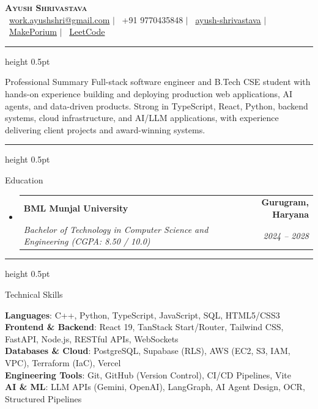 \documentclass[letterpaper,10pt]{article}
\makeatletter
\renewcommand{\section}{\@ifstar\@sectionStar\@sectionNoStar}
\newcommand{\@sectionStar}[1]{%
  \par\vspace{4.5pt}%
  {\large\bfseries\scshape #1}%
  \par\vspace{2.5pt}%
  \hrule height 0.5pt%
  \par\vspace{3.5pt}%
}
\newcommand{\@sectionNoStar}[1]{%
  \par\vspace{4.5pt}%
  {\large\bfseries\scshape #1}%
  \par\vspace{2.5pt}%
  \hrule height 0.5pt%
  \par\vspace{3.5pt}%
}
\newcommand{\resumeSubheading}[4]{
  \item
    \begin{tabular*}{\textwidth}[t]{l@{\extracolsep{\fill}}r}
      \textbf{#1} & \textbf{\small #2} \\
      \textit{\small#3} & \textit{\small #4} \\
    \end{tabular*}\vspace{-2pt}
}
\newcommand{\resumeSubHeadingListStart}{\begin{itemize}[leftmargin=0.0in, label={}, topsep=1pt, itemsep=2.5pt]}
\newcommand{\resumeSubHeadingListEnd}{\end{itemize}\vspace{-2pt}}
\makeatother
\begin{document}
\begin{center}
    {\LARGE \scshape \textbf{Ayush Shrivastava}} \\ \vspace{3pt}
    \small 
    \faEnvelope\ \href{mailto:work.ayushshri@gmail.com}{work.ayushshri@gmail.com} \quad$|$\quad
    \faPhone\ +91 9770435848 \quad$|$\quad
    \faLinkedin\ \href{https://www.linkedin.com/in/ayush-shrivastava-9439a232b/}{ayush-shrivastava} \quad$|$\quad
    \faGithub\ \href{https://github.com/MakePorium}{MakePorium} \quad$|$\quad
    \faCode\ \href{https://leetcode.com/u/MakePorium/}{LeetCode}
\end{center}
\vspace{-4pt}

\section{Professional Summary}
\small{Full-stack software engineer and B.Tech CSE student with hands-on experience building and deploying production web applications, AI agents, and data-driven products. Strong in TypeScript, React, Python, backend systems, cloud infrastructure, and AI/LLM applications, with experience delivering client projects and award-winning systems.}

\section{Education}
  \resumeSubHeadingListStart
    \resumeSubheading
      {BML Munjal University}{Gurugram, Haryana}
      {Bachelor of Technology in Computer Science and Engineering (CGPA: 8.50 / 10.0)}{2024 -- 2028}
  \resumeSubHeadingListEnd

\section{Technical Skills}
\begin{itemize}[leftmargin=0.0in, label={}, topsep=1pt, itemsep=1.5pt]
    \small{\item{
     \textbf{Languages}{: C++, Python, TypeScript, JavaScript, SQL, HTML5/CSS3} \\ \vspace{1pt}
     \textbf{Frontend \& Backend}{: React 19, TanStack Start/Router, Tailwind CSS, FastAPI, Node.js, RESTful APIs, WebSockets} \\ \vspace{1pt}
     \textbf{Databases \& Cloud}{: PostgreSQL, Supabase (RLS), AWS (EC2, S3, IAM, VPC), Terraform (IaC), Vercel} \\ \vspace{1pt}
     \textbf{Engineering Tools}{: Git, GitHub (Version Control), CI/CD Pipelines, Vite} \\ \vspace{1pt}
     \textbf{AI \& ML}{: LLM APIs (Gemini, OpenAI), LangGraph, AI Agent Design, OCR, Structured Pipelines}
    }}
\end{itemize}
\vspace{-3pt}
\end{document}
